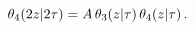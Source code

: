 \[\mathop{\theta_{4}\/}\nolimits\!\left(2z\middle|2\tau\right)=A\mathop{\theta_{%
3}\/}\nolimits\!\left(z\middle|\tau\right)\mathop{\theta_{4}\/}\nolimits\!%
\left(z\middle|\tau\right).\]